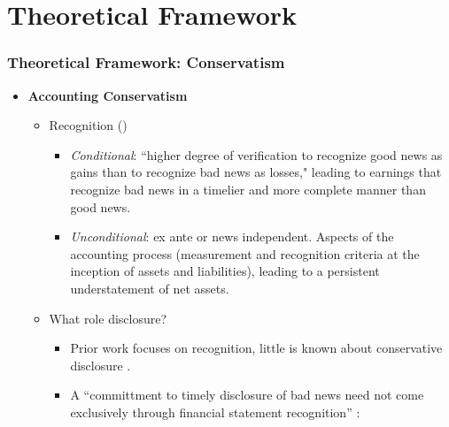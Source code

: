 \documentclass{beamer}
\begin{document}
\section{Theoretical Framework}
\begin{frame}
\frametitle{Theoretical Framework: Conservatism}
\begin{itemize}
	
	\item \textbf{Accounting Conservatism}
	
	\begin{itemize}
		
		\item Recognition (\citet{beaverConditionalUnconditionalConservatism2005,ballEarningsQualityUK2005})
			\begin{itemize}
		\item \textit{Conditional}: ``higher degree of verification to recognize good news as gains than to recognize bad news as losses," \citep*[p. 7]{basuConservatismPrincipleAsymmetric1997} leading to earnings that recognize bad news in a timelier and more complete manner than good news.
		\item \textit{Unconditional}: ex ante or news independent. Aspects of the accounting process (measurement and recognition criteria at the inception of assets and liabilities), leading to a persistent understatement of net assets.
		 	\end{itemize}
		\pause
		
		\medskip
		
		\item What role disclosure? 
			\begin{itemize}		
		\item  Prior work focuses on recognition, little is known about conservative disclosure \cite[p.243]{kothariManagersWithholdBad2009}.	
		\item A ``committment to timely disclosure of bad news need not come exclusively through financial statement recognition'' \cite*[p. 73-74]{guayConservativeDisclosure2018}:
			
				
					\end{itemize}
		
	\end{itemize}
	
\end{itemize}
\end{frame}
\end{document}
